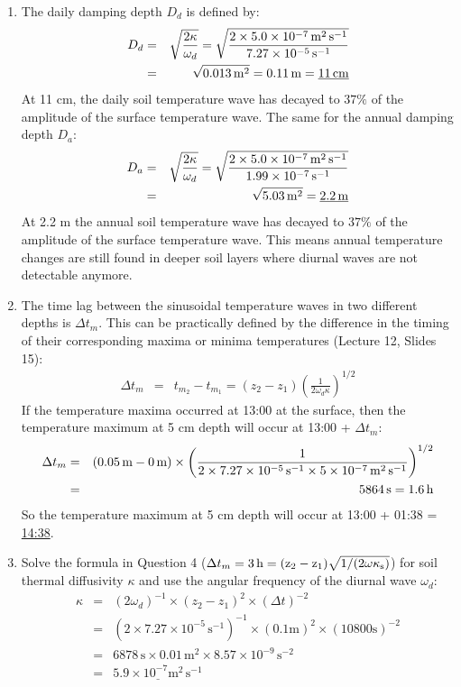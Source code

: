 \documentclass[11pt]{article}
\begin{document}
\begin{enumerate}
\item The daily damping depth $D_d$ is defined by:
\begin{eqnarray*} 
D_d &=& \sqrt{\frac{2 \kappa}{\omega_d}} = \sqrt{\frac{2 \times 5.0 \times 10^{-7}\,\rm{m}^2\,\rm{s}^{-1}}{7.27 \times 10^{-5}\,\rm{s}^{-1}}} \\
&=&\sqrt{0.013\,\rm{m}^{2}} = 0.11\,\rm{m} = \underline{11\,\rm{cm}}
\end{eqnarray*} 
At 11 cm, the daily soil temperature wave has decayed to $37\%$ of the amplitude of the surface temperature wave.
The same for the annual damping depth $D_a$:
\begin{eqnarray*} 
D_a &=& \sqrt{\frac{2 \kappa}{\omega_d}} = \sqrt{\frac{2 \times 5.0 \times 10^{-7}\,\rm{m}^2\,\rm{s}^{-1}}{1.99 \times 10^{-7}\,\rm{s}^{-1}}} \\
&=&\sqrt{5.03\,\rm{m}^{2}} = \underline{2.2\,\rm{m}}
\end{eqnarray*} 
At 2.2 m the annual soil temperature wave has decayed to $37\%$ of the amplitude of the surface temperature wave. This means annual temperature changes are still found in deeper soil layers where diurnal waves are not detectable anymore.

\item The time lag between the sinusoidal temperature waves in two different depths is $\Delta t_m$. This can be practically defined by the difference in the timing of their corresponding maxima or minima temperatures (Lecture 12, Slides 15):
\begin{eqnarray*} 
\Delta t_m &=& t_{m_2} - t_{m_1} = (z_2 - z_1) \left( \frac{1}{2 \omega_d \kappa} \right)^{1/2}
\end{eqnarray*} 
If the temperature maxima occurred at 13:00 at the surface, then the temperature maximum at 5 cm depth will occur at 13:00 + $\Delta t_m$:
\begin{eqnarray*} 
\Delta t_m &=& (0.05\,\rm{m} - 0\,\rm{m}) \times \left( \frac{1}{2 \times 7.27 \times 10^{-5}\,\rm{s}^{-1} \times 5 \times 10^{-7}\,\rm{m}^2\,\rm{s}^{-1}} \right)^{1/2} \\
&=& 5864\,\rm{s} = 1.6 \, \rm{h}
\end{eqnarray*} 
So the temperature maximum at 5 cm depth will occur at 13:00 + 01:38 = \underline{14:38}.

\item Solve the formula in Question 4 ($\Delta t_m = 3\,\rm{h} = (z_2 - z_1) \sqrt{1/(2 \omega \kappa_s)}$) for soil thermal diffusivity $\kappa$ and use the angular frequency of the diurnal wave $\omega_d$:
\begin{eqnarray*} 
\kappa &=& (2 \omega_d)^{-1} \times (z_2-z_1)^{2} \times (\Delta t )^{-2} \\
&=& (2 \times 7.27 \times 10^{-5}\,\textrm{s}^{-1})^{-1} \times (0.1 \textrm{m})^{2} \times (10800 \textrm{s})^{-2} \\
&=& 6878\, \textrm{s} \times 0.01\, \textrm{m}^{2} \times 8.57 \times 10^{-9}\, \textrm{s}^{-2} \\
&=& \underline{5.9 \times 10^{-7} \textrm{m}^2\, \textrm{s}^{-1}}
\end{eqnarray*}


\end{enumerate}
\end{document}
